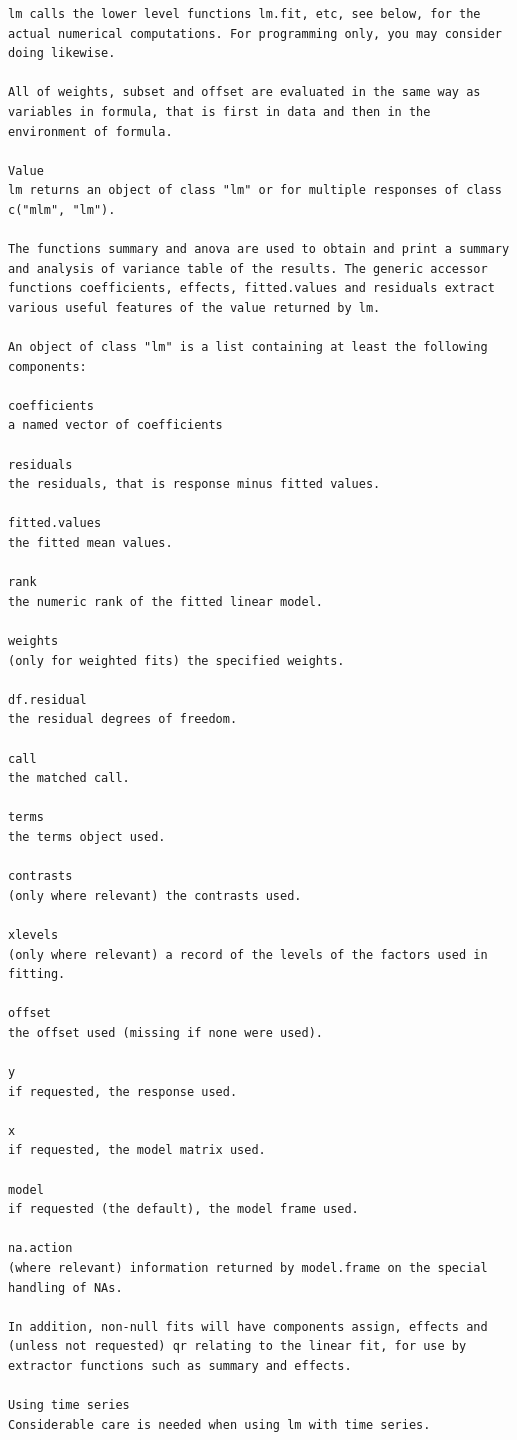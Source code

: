 \documentclass[
]{article}
\begin{document}
\begin{verbatim}
lm calls the lower level functions lm.fit, etc, see below, for the actual numerical computations. For programming only, you may consider doing likewise.

All of weights, subset and offset are evaluated in the same way as variables in formula, that is first in data and then in the environment of formula.

Value
lm returns an object of class "lm" or for multiple responses of class c("mlm", "lm").

The functions summary and anova are used to obtain and print a summary and analysis of variance table of the results. The generic accessor functions coefficients, effects, fitted.values and residuals extract various useful features of the value returned by lm.

An object of class "lm" is a list containing at least the following components:

coefficients    
a named vector of coefficients

residuals   
the residuals, that is response minus fitted values.

fitted.values   
the fitted mean values.

rank    
the numeric rank of the fitted linear model.

weights 
(only for weighted fits) the specified weights.

df.residual 
the residual degrees of freedom.

call    
the matched call.

terms   
the terms object used.

contrasts   
(only where relevant) the contrasts used.

xlevels 
(only where relevant) a record of the levels of the factors used in fitting.

offset  
the offset used (missing if none were used).

y   
if requested, the response used.

x   
if requested, the model matrix used.

model   
if requested (the default), the model frame used.

na.action   
(where relevant) information returned by model.frame on the special handling of NAs.

In addition, non-null fits will have components assign, effects and (unless not requested) qr relating to the linear fit, for use by extractor functions such as summary and effects.

Using time series
Considerable care is needed when using lm with time series.


\end{verbatim}
\end{document}
